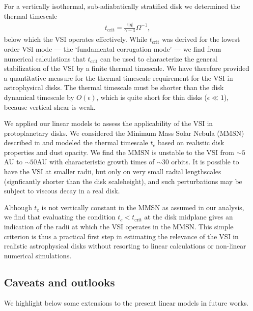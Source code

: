 For a vertically isothermal, sub-adiabatically stratified disk we
determined the thermal timescale   
\begin{align*}
  t_\mathrm{crit} = \frac{\epsilon |q|}{\gamma-1}\Omega^{-1}, 
\end{align*}
below which the VSI operates effectively. While $t_\mathrm{crit}$ was
derived for the lowest order VSI mode --- the `fundamental  
corrugation mode' --- we find from numerical calculations that
$t_\mathrm{crit}$ can be used to characterize the general
stabilization of the VSI by a finite thermal timescale. %
We have therefore provided a quantitative measure for the thermal
timescale requirement for the VSI in astrophysical 
disks. The thermal timescale must be shorter than the disk
dynamical timescale by $O(\epsilon)$, which is
quite short for thin disks ($\epsilon\ll 1$), because vertical shear is weak.    

We applied our linear models to assess the applicability of the VSI in
protoplanetary disks. We considered the Minimum Mass Solar Nebula 
(MMSN) described in \cite{chiang10} and   
modeled the thermal timescale $t_c$ based on realistic
disk properties and dust opacity. 
We find the MMSN is unstable to the VSI 
from $\sim 5$AU to $\sim50$AU with characteristic growth times of
$\sim 30$ orbits. It is possible to have the VSI at smaller
radii, but only on very small radial lengthscales (signficantly shorter
than the disk scaleheight), and such perturbations may
be subject to viscous decay in a real disk.   

Although $t_c$ is not vertically constant in the 
MMSN as assumed in our analysis, we find that evaluating the condition
$t_c< t_\mathrm{crit}$ at the disk midplane gives an indication of the
radii at which the VSI operates in the MMSN. This simple criterion is
thus a practical first step in estimating the relevance of the VSI in
realistic astrophysical disks without resorting to linear
calculations or non-linear numerical simulations.   

\subsection{Caveats and outlooks} 
We highlight below some extensions to the present  
linear models in future works.  

